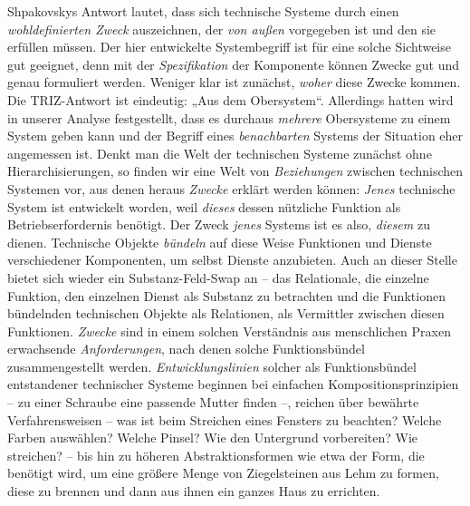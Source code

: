 \documentclass[12pt,a4paper]{article}
\begin{document}
Shpakovskys Antwort lautet, dass sich technische Systeme durch einen
\emph{wohldefinierten Zweck} auszeichnen, der \emph{von außen} vorgegeben ist
und den sie erfüllen müssen.  Der hier entwickelte Systembegriff ist für eine
solche Sichtweise gut geeignet, denn mit der \emph{Spezifikation} der
Komponente können Zwecke gut und genau formuliert werden. Weniger klar ist
zunächst, \emph{woher} diese Zwecke kommen.  Die TRIZ-Antwort ist eindeutig:
„Aus dem Obersystem“. Allerdings hatten wird in unserer Analyse festgestellt,
dass es durchaus \emph{mehrere} Obersysteme zu einem System geben kann und der
Begriff eines \emph{benachbarten} Systems der Situation eher angemessen ist.
Denkt man die Welt der technischen Systeme zunächst ohne Hierarchisierungen,
so finden wir eine Welt von \emph{Beziehungen} zwischen technischen Systemen
vor, aus denen heraus \emph{Zwecke} erklärt werden können: \emph{Jenes}
technische System ist entwickelt worden, weil \emph{dieses} dessen nützliche
Funktion als Betriebserfordernis benötigt. Der Zweck \emph{jenes} Systems ist
es also, \emph{diesem} zu dienen.  Technische Objekte \emph{bündeln} auf diese
Weise Funktionen und Dienste verschiedener Komponenten, um selbst Dienste
anzubieten.  Auch an dieser Stelle bietet sich wieder ein Substanz-Feld-Swap
an -- das Relationale, die einzelne Funktion, den einzelnen Dienst als
Substanz zu betrachten und die Funktionen bündelnden technischen Objekte als
Relationen, als Vermittler zwischen diesen Funktionen.  \emph{Zwecke} sind in
einem solchen Verständnis aus menschlichen Praxen erwachsende
\emph{Anforderungen}, nach denen solche Funktionsbündel zusammengestellt
werden.  \emph{Entwicklungslinien} solcher als Funktionsbündel entstandener
technischer Systeme beginnen bei einfachen Kompositionsprinzipien -- zu einer
Schraube eine passende Mutter finden --, reichen über bewährte
Verfahrensweisen -- was ist beim Streichen eines Fensters zu beachten? Welche
Farben auswählen? Welche Pinsel? Wie den Untergrund vorbereiten? Wie
streichen? -- bis hin zu höheren Abstraktionsformen wie etwa der Form, die
benötigt wird, um eine größere Menge von Ziegelsteinen aus Lehm zu formen,
diese zu brennen und dann aus ihnen ein ganzes Haus zu errichten.
\end{document}
